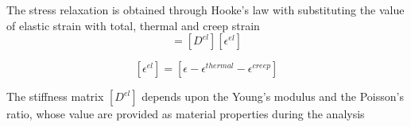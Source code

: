 \begin{comment}

Mass continuity equation inside the domain of ingot can be written as

\[ \triangledown \cdot \sigma = 0 \]

In case of a cylindrical geometry the partial differential equations for above equation can be written as

\[ \frac{1}{r}\frac{\partial}{\partial r} (r \sigma_{rr})
+ \frac{\partial}{\partial z} \sigma_{rz} - \frac{\sigma_{\theta \theta}}{r} + b_{r} = 0
\]
\[ \frac{1}{r}\frac{\partial}{\partial r} (r \sigma_{zr})
+ \frac{\partial}{\partial z} \sigma_{zz} + b_{z} = 0\]

\[ \epsilon_{rr} = \frac{\partial u_{r}}{\partial r},\quad
                    \epsilon_{zz} = \frac{\partial u_{z}}{\partial z}, \quad
                    \epsilon_{\theta \theta} = \frac{u_{r}}{r}, \quad
                    \gamma_{rz} = \frac{\partial u_{r}}{\partial z} 
                    + \frac{\partial u_{z}}{\partial r} 
                    = \epsilon_{rz} + \epsilon_{zr}
                    = 2\epsilon_{rz}

\]

Where sigma-rr, sigma-zz, sigma-00 and sigma-rz are the normal stresses in the radial, axial, and azimuthal directions and the shear stress respectively. Due to presence of a radial symmetry of temperature distribution inside the ingot during solidification, the stress and the strain fields will be also be axisymmetric. This means that U-THETA and DEL/DEL-THETA terms will be 0. The equilibrium and the strain-displacement equations can be re written as 
\end{comment}


The stress relaxation is obtained through Hooke's law with substituting the value of elastic strain with total, thermal and creep strain
\begin{equation}
[\sigma] = [D^{el}] [\epsilon^{el}] 
\end{equation}

\[ [\epsilon^{el}] = [\epsilon - \epsilon^{thermal} - \epsilon^{creep}]\]


The stiffness matrix $[D^{el}]$ depends upon the Young's modulus and the Poisson's ratio, whose value are provided as material properties during the analysis

